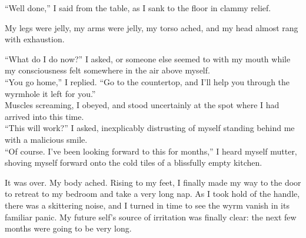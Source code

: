 ``Well done,'' I said from the table, as I sank to the floor in clammy relief.

My legs were jelly, my arms were jelly, my torso ached, and my head almost rang with exhaustion.

``What do I do now?'' I asked, or someone else seemed to with my mouth while my consciousness felt somewhere in the air above myself.\\
``You go home,'' I replied. ``Go to the countertop, and I'll help you through the wyrmhole it left for you.''\\
Muscles screaming, I obeyed, and stood uncertainly at the spot where I had arrived into this time.\\
``This will work?'' I asked, inexplicably distrusting of myself standing behind me with a malicious smile.\\
``Of course. I've been looking forward to this for months,'' I heard myself mutter, shoving myself forward onto the cold tiles of a blissfully empty kitchen.

It was over. My body ached. Rising to my feet, I finally made my way to the door to retreat to my bedroom and take a very long nap. As I took hold of the handle, there was a skittering noise, and I turned in time to see the wyrm vanish in its familiar panic. My future self's source of irritation was finally clear: the next few months were going to be very long.
